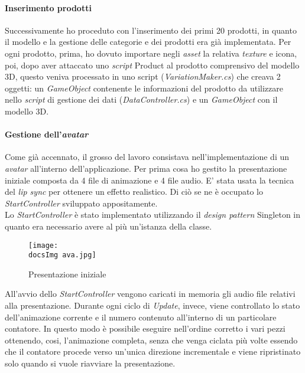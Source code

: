 \paragraph{Inserimento prodotti}
Successivamente ho proceduto con l'inserimento dei primi 20 prodotti, in quanto il modello e la gestione delle categorie e dei prodotti era gi\`a implementata. Per ogni prodotto, prima, ho dovuto importare negli \textit{asset\gloss} la relativa \textit{texture\gloss} e icona, poi, dopo aver attaccato uno \textit{script} Product al prodotto comprensivo del modello 3D, questo veniva processato in uno script (\textit{VariationMaker.cs}) che creava 2 oggetti: un \textit{GameObject} contenente le informazioni del prodotto da utilizzare nello \textit{script} di gestione dei dati (\textit{DataController.cs}) e un \textit{GameObject} con il modello 3D.\\

\paragraph{Gestione dell'\textit{avatar\gloss}}
Come gi\`a accennato, il grosso del lavoro consistava nell'implementazione di un \textit{avatar\gloss} all'interno dell'applicazione. Per prima cosa ho gestito la presentazione iniziale composta da 4 file di animazione e 4 file audio. E' stata usata la tecnica del \textit{lip sync} per ottenere un effetto realistico. Di ci\`o se ne \`e occupato lo \textit{StartController} sviluppato appositamente.\\
Lo \textit{StartController} \`e stato implementato utilizzando il \textit{design pattern} Singleton in quanto era necessario avere al pi\`u un'istanza della classe.\\

	
	\begin{figure}[H]
		\centering
		\texttt{[image: \\docsImg ava.jpg]}
		\caption{Presentazione iniziale}
		\label{fig:Presentazione iniziale}
	\end{figure}


All'avvio dello \textit{StartController} vengono caricati in memoria gli audio file relativi alla presentazione. Durante ogni ciclo di \textit{Update}, invece, viene controllato lo stato dell'animazione corrente e il numero contenuto all'interno di un particolare contatore. In questo modo \`e possibile eseguire nell'ordine corretto i vari pezzi ottenendo, cosi, l'animazione completa, senza che venga ciclata pi\`u volte essendo che il contatore procede verso un'unica direzione incrementale e viene ripristinato solo quando si vuole riavviare la presentazione.\\


